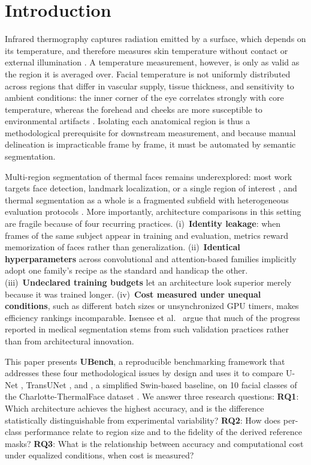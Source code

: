 \section{Introduction} \label{sec:introducao}

Infrared thermography captures radiation emitted by a surface, which depends on its temperature, and therefore measures skin temperature without contact or external illumination \cite{Nowakowski2025}.
A temperature measurement, however, is only as valid as the region it is averaged over.
Facial temperature is not uniformly distributed across regions that differ in vascular supply, tissue thickness, and sensitivity to ambient conditions: the inner corner of the eye correlates strongly with core temperature, whereas the forehead and cheeks are more susceptible to environmental artifacts \cite{Ioannou2014,Gioia2024}.
Isolating each anatomical region is thus a methodological prerequisite for downstream measurement, and because manual delineation is impracticable frame by frame, it must be automated by semantic segmentation.

Multi-region segmentation of thermal faces remains underexplored: most work targets face detection, landmark localization, or a single region of interest \cite{Vega2025,Chu2019,Jerbi2024}, and thermal segmentation as a whole is a fragmented subfield with heterogeneous evaluation protocols \cite{Kutuk2022}.
More importantly, architecture comparisons in this setting are fragile because of four recurring practices.
(i)~\textbf{Identity leakage}: when frames of the same subject appear in training and evaluation, metrics reward memorization of faces rather than generalization.
(ii)~\textbf{Identical hyperparameters} across convolutional and attention-based families implicitly adopt one family's recipe as the standard and handicap the other.
(iii)~\textbf{Undeclared training budgets} let an architecture look superior merely because it was trained longer.
(iv)~\textbf{Cost measured under unequal conditions}, such as different batch sizes or unsynchronized GPU timers, makes efficiency rankings incomparable.
Isensee et al.~\cite{Isensee2024} argue that much of the progress reported in medical segmentation stems from such validation practices rather than from architectural innovation.

This paper presents \textbf{UBench}, a reproducible benchmarking framework that addresses these four methodological issues by design and uses it to compare U-Net \cite{Ronneberger2015}, TransUNet \cite{Chen2021}, and \swinp{}, a simplified Swin-based baseline, on 10 facial classes of the Charlotte-ThermalFace dataset \cite{Ashrafi2022}.
We answer three research questions:
\textbf{RQ1}: Which architecture achieves the highest accuracy, and is the difference statistically distinguishable from experimental variability?
\textbf{RQ2}: How does per-class performance relate to region size and to the fidelity of the derived reference masks?
\textbf{RQ3}: What is the relationship between accuracy and computational cost under equalized conditions, when cost is measured?

